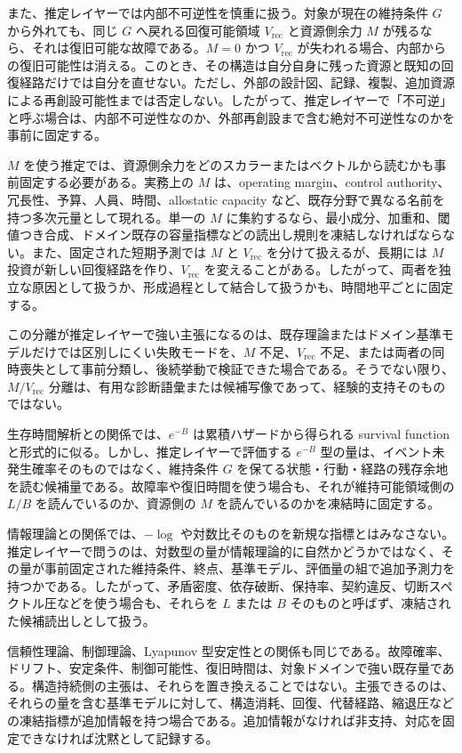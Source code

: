 \documentclass[12pt,a4paper]{article}
\begin{document}
また、推定レイヤーでは内部不可逆性を慎重に扱う。対象が現在の維持条件 \(G\) から外れても、同じ \(G\) へ戻れる回復可能領域 \(V_{\mathrm{rec}}\) と資源側余力 \(M\) が残るなら、それは復旧可能な故障である。\(M=0\) かつ \(V_{\mathrm{rec}}\) が失われる場合、内部からの復旧可能性は消える。このとき、その構造は自分自身に残った資源と既知の回復経路だけでは自分を直せない。ただし、外部の設計図、記録、複製、追加資源による再創設可能性までは否定しない。したがって、推定レイヤーで「不可逆」と呼ぶ場合は、内部不可逆性なのか、外部再創設まで含む絶対不可逆性なのかを事前に固定する。

\(M\) を使う推定では、資源側余力をどのスカラーまたはベクトルから読むかも事前固定する必要がある。実務上の \(M\) は、operating margin、control authority、冗長性、予算、人員、時間、allostatic capacity など、既存分野で異なる名前を持つ多次元量として現れる。単一の \(M\) に集約するなら、最小成分、加重和、閾値つき合成、ドメイン既存の容量指標などの読出し規則を凍結しなければならない。また、固定された短期予測では \(M\) と \(V_{\mathrm{rec}}\) を分けて扱えるが、長期には \(M\) 投資が新しい回復経路を作り、\(V_{\mathrm{rec}}\) を変えることがある。したがって、両者を独立な原因として扱うか、形成過程として結合して扱うかも、時間地平ごとに固定する。

この分離が推定レイヤーで強い主張になるのは、既存理論またはドメイン基準モデルだけでは区別しにくい失敗モードを、\(M\) 不足、\(V_{\mathrm{rec}}\) 不足、または両者の同時喪失として事前分類し、後続挙動で検証できた場合である。そうでない限り、\(M/V_{\mathrm{rec}}\) 分離は、有用な診断語彙または候補写像であって、経験的支持そのものではない。

生存時間解析との関係では、\(e^{-B}\) は累積ハザードから得られる survival function と形式的に似る。しかし、推定レイヤーで評価する \(e^{-B}\) 型の量は、イベント未発生確率そのものではなく、維持条件 \(G\) を保てる状態・行動・経路の残存余地を読む候補量である。故障率や復旧時間を使う場合も、それが維持可能領域側の \(L/B\) を読んでいるのか、資源側の \(M\) を読んでいるのかを凍結時に固定する。

情報理論との関係では、\(-\log\) や対数比そのものを新規な指標とはみなさない。推定レイヤーで問うのは、対数型の量が情報理論的に自然かどうかではなく、その量が事前固定された維持条件、終点、基準モデル、評価量の組で追加予測力を持つかである。したがって、矛盾密度、依存破断、保持率、契約違反、切断スペクトル圧などを使う場合も、それらを \(L\) または \(B\) そのものと呼ばず、凍結された候補読出しとして扱う。

信頼性理論、制御理論、Lyapunov 型安定性との関係も同じである。故障確率、ドリフト、安定条件、制御可能性、復旧時間は、対象ドメインで強い既存量である。構造持続側の主張は、それらを置き換えることではない。主張できるのは、それらの量を含む基準モデルに対して、構造消耗、回復、代替経路、縮退圧などの凍結指標が追加情報を持つ場合である。追加情報がなければ非支持、対応を固定できなければ沈黙として記録する。
\end{document}
